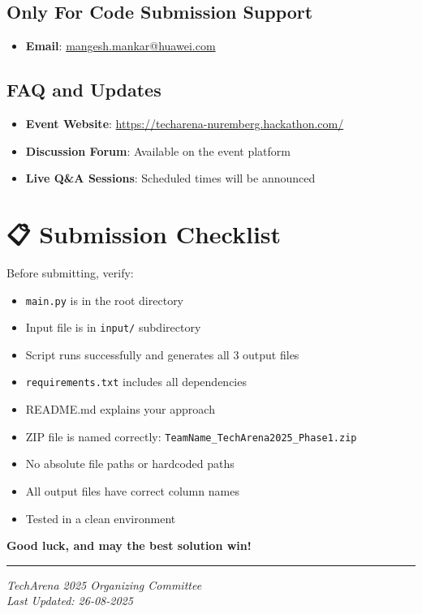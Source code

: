 \documentclass[11pt,a4paper]{article}
\begin{document}
\subsection*{Only For Code Submission Support}
\begin{itemize}
    \item \textbf{Email}: \href{mailto:mangesh.mankar@huawei.com}{mangesh.mankar@huawei.com}
\end{itemize}

\subsection*{FAQ and Updates}
\begin{itemize}
    \item \textbf{Event Website}: \url{https://techarena-nuremberg.hackathon.com/}
    \item \textbf{Discussion Forum}: Available on the event platform
    \item \textbf{Live Q\&A Sessions}: Scheduled times will be announced
\end{itemize}

\section*{📋 Submission Checklist}

Before submitting, verify:

\begin{itemize}
    \item[$\square$] \texttt{main.py} is in the root directory
    \item[$\square$] Input file is in \texttt{input/} subdirectory
    \item[$\square$] Script runs successfully and generates all 3 output files
    \item[$\square$] \texttt{requirements.txt} includes all dependencies
    \item[$\square$] README.md explains your approach
    \item[$\square$] ZIP file is named correctly: \texttt{TeamName\_TechArena2025\_Phase1.zip}
    \item[$\square$] No absolute file paths or hardcoded paths
    \item[$\square$] All output files have correct column names
    \item[$\square$] Tested in a clean environment
\end{itemize}

\vspace{1cm}

\begin{center}
\Large{\textbf{Good luck, and may the best solution win! 🚀}}
\end{center}

\vspace{1cm}

\hrule
\vspace{0.5cm}
\textit{TechArena 2025 Organizing Committee}\\
\textit{Last Updated: 26-08-2025}
\end{document}
